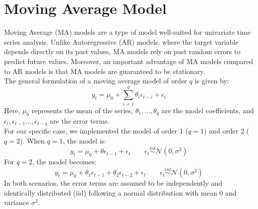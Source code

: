 \section{Moving Average Model}
\label{sec:MA}
Moving Average (MA) models are a type of model well-suited for univariate time series analysis. Unlike Autoregressive (AR) models, where the target variable depends directly on its past values, MA models rely on past random errors to predict future values.
Moreover, an important advantage of MA models compared to AR models is that MA models are guaranteed to be stationary. \\
The general formulation of a moving average model of order $q$ is given by:
\begin{equation}
    y_{t} = \mu_0 + \sum_{i=1}^{q} \theta_i \epsilon_{t-i} + \epsilon_{t}
\end{equation}
Here, $\mu_0$ represents the mean of the series, $\theta_1, ... , \theta_q$ are the model coefficients, and $\epsilon_t, \epsilon_{t-1}... , \epsilon_{t-q}$ are the error terms. \\
For our specific case, we implemented the model of order 1 ($q=1$) and order 2 ($q=2$). When $q=1$, the model is:
\begin{equation}
    \label{MA_q1}
    y_{t}=\mu_{0}+\theta \epsilon_{t-1} +\epsilon_t \qquad 
    \epsilon_t \stackrel{iid}{\sim} \mathcal{N}(0,\sigma^2)
\end{equation}
For $q=2$, the model becomes:
\begin{equation}
    \label{MA_q2}
    y_{t}=\mu_{0}+\theta_1 \epsilon_{t-1}+\theta_2 \epsilon_{t-2}+\epsilon_t   \qquad 
    \epsilon_t \stackrel{iid}{\sim} \mathcal{N}(0,\sigma^2)
\end{equation}
In both scenarios, the error terms are assumed to be independently and identically distributed (iid) following a normal distribution with mean 0 and variance $\sigma^2$.

